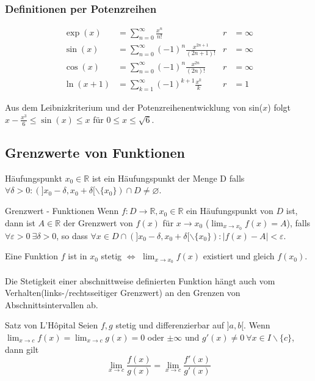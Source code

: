 \documentclass[a4paper,fontsize = 7pt]{scrartcl}
\def\sumk{\sum_{k=1}^\infty}
\def\sumn{\sum_{n=0}^\infty}
\def\R{\mathbb{R}}
\begin{document}
\subsubsection{Definitionen per Potenzreihen}
\begin{align*}
\exp(x) &= \sumn \frac{x^n}{n!} & r &= \infty \\
\sin(x) &= \sumn (-1)^n \frac{x^{2n + 1}}{(2n + 1)!} & r &= \infty \\
\cos(x) &= \sumn (-1)^n \frac{x^{2n}}{(2n)!} & r &= \infty \\
\ln(x + 1) &= \sumk (-1)^{k+1} \frac{x^k}{k} & r &= 1
\end{align*}

Aus dem Leibnizkriterium und der Potenzreihenentwicklung von sin($x$) folgt $x - \frac{x^3}{6} \leq \sin (x) \leq x$ für $0 \leq x \leq \sqrt{6}$.

\subsection{Grenzwerte von Funktionen}
\begin{subbox}{Häufungspunkt}
  \vspace{-4pt}
 $x_0 \in \R$ ist ein Häufungspunkt der Menge D falls $\forall \delta > 0: (]x_0 - \delta, x_0 + \delta[ \backslash \{x_0\}) \cap D \ne \varnothing$.
 \vspace{-8pt}
\end{subbox}

\begin{mainbox}{Grenzwert - Funktionen}
  \vspace{-4pt}
 Wenn $f: D \to \R, x_0 \in \R$ ein Häufungspunkt von $D$ ist, dann ist $A \in \R$ der Grenzwert von $f(x)$ für $x \to x_0$ ($\lim_{x\to x_0} f(x) = A$), falls $\forall \varepsilon > 0 \ \exists \delta > 0$, so dass $\forall x \in D \cap (]x_0 - \delta, x_0 + \delta[ \backslash \{x_0\}): |f(x) - A| < \varepsilon$.
 \vspace{-4pt}
\end{mainbox}
Eine Funktion $f$ ist in $x_0$ stetig $\iff$ $\lim_{x \to x_0} f(x)$ existiert und gleich $f(x_0)$.
\\ \\
Die Stetigkeit einer abschnittweise definierten Funktion hängt auch vom Verhalten(links-/rechtsseitiger Grenzwert) an den Grenzen von Abschnittsintervallen ab.

\begin{subbox}{Satz von L'Hôpital}
  \vspace{-4pt}
  Seien $f,g$ stetig und differenzierbar auf $]a,b[$. Wenn $\lim_{x\to c} f(x) = \lim_{x \to c} g(x) = 0$ oder $\pm \infty$ und $g'(x) \ne 0 \ \forall x \in I \backslash \{c\}$, dann gilt $$\lim_{x\to c} \frac{f(x)}{g(x)} = \lim_{x\to c}\frac{f'(x)}{g'(x)}$$
  \vspace{-12pt}
\end{subbox}
\end{document}
